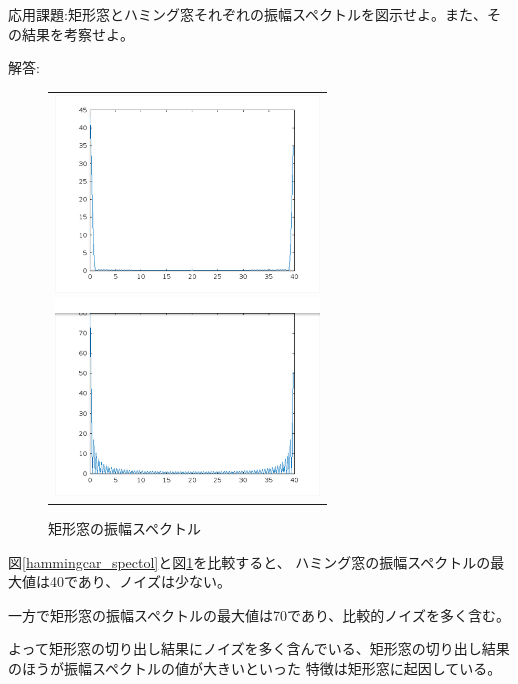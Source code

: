 \documentclass[a4paper,11pt]{ltjsarticle}
\begin{document}
応用課題:矩形窓とハミング窓それぞれの振幅スペクトルを図示せよ。また、その結果を考察せよ。

解答:
\begin{figure}[H]
\begin{center}
\begin{tabular}{c}
\begin{minipage}{0.5\hsize}
\begin{center}
\includegraphics[width=7cm]{DSP1/R1_K2_8}
\end{center}
\caption{ハミング窓の振幅スペクトル}
\label{hammingcar_spectol}
\end{minipage}
\begin{minipage}{0.5\hsize}
\begin{center}
\includegraphics[width=7cm]{DSP1/R1_K2_9}
\end{center}
\caption{矩形窓の振幅スペクトル}
\label{boxcar_spectol}
\end{minipage}
\end{tabular}
\end{center}
\end{figure}

図\ref{hammingcar_spectol}と図\ref{boxcar_spectol}を比較すると、
ハミング窓の振幅スペクトルの最大値は40であり、ノイズは少ない。

一方で矩形窓の振幅スペクトルの最大値は70であり、比較的ノイズを多く含む。

よって矩形窓の切り出し結果にノイズを多く含んでいる、矩形窓の切り出し結果のほうが振幅スペクトルの値が大きいといった
特徴は矩形窓に起因している。
\end{document}
